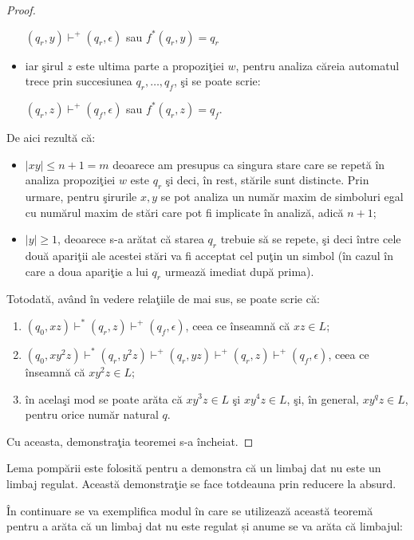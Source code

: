 \begin{proof}
\begin{itemize}
$ (q_r,y) \vdash^+ (q_r, \epsilon)  $ sau $ f^*(q_r, y) = q_r $
\item
iar şirul $ z $ este ultima parte a propoziţiei $ w $, pentru analiza căreia automatul trece prin succesiunea $q_r, \dots, q_f $, şi se poate scrie:

$ (q_r,z) \vdash^+ (q_f, \epsilon)  $ sau $ f^*(q_r, z) = q_f $.
\end{itemize}

De aici rezultă că:

\begin{itemize}
\item
$ |xy| \leq n + 1 = m $ deoarece am presupus ca singura stare care se repetă în analiza propoziţiei $ w $ este $ q_r $ şi deci, în rest, stările sunt distincte. Prin urmare, pentru şirurile $ x, y $ se pot analiza un număr maxim de simboluri egal cu numărul maxim de stări care pot fi implicate în analiză, adică $ n + 1 $;
\item
$ |y| \geq 1 $, deoarece s-a arătat că starea $ q_r $ trebuie să se repete, şi deci între cele două apariţii ale acestei stări va fi acceptat cel puţin un simbol (în cazul în care a doua apariţie a lui $ q_r $ urmează imediat după prima).
\end{itemize}

Totodată, având în vedere relaţiile de mai sus, se poate scrie că:

\begin{enumerate}
\item
$ (q_0,xz) \vdash^* (q_r, z) \vdash^+ (q_f, \epsilon) $, ceea ce înseamnă că $ xz \in L $;
\item
$ (q_0,xy^{2}z) \vdash^* (q_r, y^{2}z) \vdash^+ (q_r, yz) \vdash^+ (q_r, z) \vdash^+ (q_f, \epsilon)$, ceea ce înseamnă că $ xy^{2}z \in L $;
\item
în acelaşi mod se poate arăta că $ xy^{3}z \in L $ şi $ xy^{4}z \in L $, şi, în general, $ xy^{q}z \in L $, pentru orice număr natural $ q $.
\end{enumerate}

Cu aceasta, demonstraţia teoremei s-a încheiat.
\end{proof}

Lema pompării este folosită pentru a demonstra că un limbaj dat nu este un limbaj regulat. Această demonstraţie se face totdeauna prin reducere la absurd. 

În continuare se va exemplifica modul în care se utilizează această teoremă pentru a arăta că un limbaj dat nu este regulat și anume se va arăta că limbajul:

